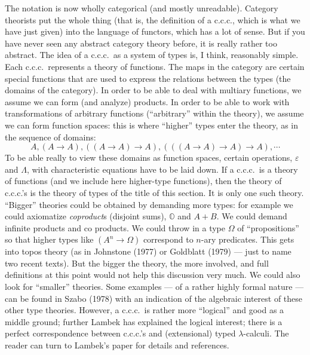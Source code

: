 \documentclass[12pt]{article}
\def\to{\rightarrow}
\def\bbzero{{\mathbb O}}
\def\ccc{{c.c.c.}}
\def\ev{\varepsilon}
\def\L{\Lambda}
\def\l{\lambda}
\begin{document}
The notation is now wholly categorical (and mostly unreadable). Category theorists put the whole thing (that is, the definition of a \ccc, which is what we have just given) into the language of functors, which has a lot of sense. But if you have never seen any abstract category theory before, it is really rather too abstract. The idea of a \ccc\ as a system of types is, I think, reasonably simple. Each \ccc\ represents a theory of functions. The maps in the category are certain special functions that are used to express the relations between the types (the domains of the category). In order to
be able to deal with multiary functions, we assume we can form
(and analyze) products. In order to be able to work with transformations of arbitrary functions (``arbitrary'' within the theory), we assume we can form function spaces: this is where ``higher'' types enter the theory, as in the sequence of domains:
$$
A, (A \to A), ((A \to A) \to A), (((A \to A) \to A) \to A), \cdots
$$
To be able really to view these domains as function spaces, certain operations, $\ev$ and $\L$, with characteristic equations have to be laid down.
If a \ccc\ is a theory of functions (and we include here higher-type functions), then the theory of \ccc's is the theory of types of the title of this section. It is only one such theory. ``Bigger'' theories could be obtained by demanding more types: for example we could axiomatize {\it coproduct}s (disjoint sums), $\bbzero$ and $A+ B$. We could demand infinite products and co products. We could throw in a type $\Omega$ of ``propositions'' so that higher types like $(A^n \to \Omega)$ correspond to $n$-ary predicates. This gets into topos theory (as in Johnstone (1977) or Goldblatt (1979) --- just to name two recent texts). But the bigger the theory, the more involved, and full definitions at this point would not help this discussion very much.
We could also look for ``smaller'' theories. Some examples --- of a rather highly formal nature --- can be found in Szabo (1978) with an indication of the algebraic interest of these other type theories. However, a \ccc\ is rather more ``logical'' and good as a middle ground; further Lambek has explained the logical interest; there is a perfect correspondence between \ccc's and (extensional) typed $\l$-calculi. The reader can turn to Lambek's paper for details and references.

\def\means#1{\llbracket\, #1 \,\rrbracket}
\end{document}
